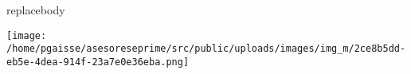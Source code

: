 \documentclass{article}
\begin{document}
\setlength\parindent{24pt}







\small

replacebody


\vspace{0.1in}
\vfill

\begin{flushright}

\vspace{-0.1in}\texttt{[image: /home/pgaisse/asesoreseprime/src/public/uploads/images/img\_m/2ce8b5dd-eb5e-4dea-914f-23a7e0e36eba.png]}\vspace{-0.1in}

\end{flushright}
\end{document}
